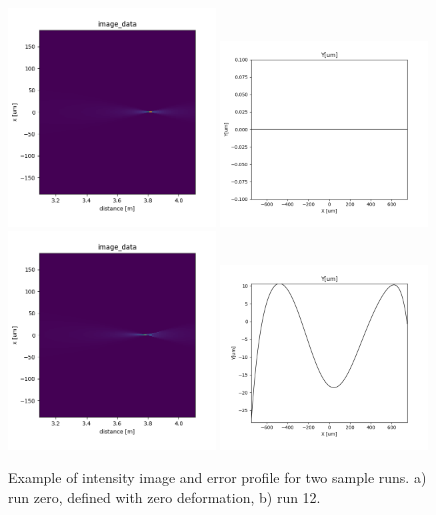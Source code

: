 \documentclass{iucr}
\begin{document}
\begin{figure}\label{fig:sample}
    \includegraphics[width=0.49\textwidth]{figures/sample0.png}
    \includegraphics[width=0.49\textwidth]{figures/sample0-error.png}
    \includegraphics[width=0.49\textwidth]{figures/sample12.png}
    \includegraphics[width=0.49\textwidth]{figures/sample12-error.png}
    \caption{Example of intensity image and error profile for two sample runs. a) run zero, defined with zero deformation, b) run 12.
    }
\end{figure}
\end{document}
